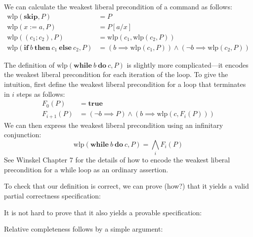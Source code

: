 We can calculate the weakest liberal precondition of a command as follows:
\begin{align*}
\mathrm{wlp}(\mathbf{skip}, P) &= P \\
\mathrm{wlp}(x := a, P) &= P[a/x] \\
\mathrm{wlp}((c_1; c_2), P) &= \mathrm{wlp}(c_1, \mathrm{wlp}(c_2, P)) \\
\mathrm{wlp}(\mathbf{if}\ b\ \mathbf{then}\ c_1\ \mathbf{else}\ c_2, P) &= (b \implies
\mathrm{wlp}(c_1, P)) \wedge (\neg b \implies \mathrm{wlp}(c_2, P))
\end{align*}

The definition of $\mathrm{wlp}(\mathbf{while}\ b\ \mathbf{do}\ c, P)$ is slightly more
complicated---it encodes the weakest liberal precondition for each iteration of the loop. To
give the intuition, first define the weakest liberal precondition for a loop that terminates in
$i$ steps as follows:
\begin{align*}
F_0(P) &= \mathbf{true} \\
F_{i+1}(P) &= (\neg b \implies P) \wedge (b \implies \mathrm{wlp}(c, F_i(P)))
\end{align*}
We can then express the weakest liberal precondition using an infinitary conjunction:
\[
\mathrm{wlp}(\mathbf{while}\ b\ \mathbf{do}\ c, P) = \bigwedge_i F_i(P)
\]
See Winskel Chapter 7 for the details of how to encode the weakest liberal precondition for a
while loop as an ordinary assertion.

To check that our definition is correct, we can prove (how?) that it yields a valid partial
correctness specification:


It is not hard to prove that it also yields a provable specification:


Relative completeness follows by a simple argument:


% 
